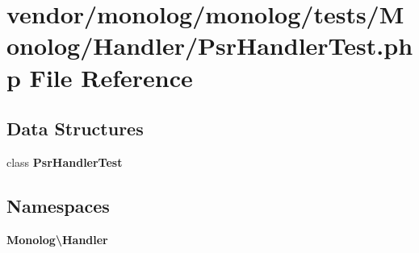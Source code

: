 \section{vendor/monolog/monolog/tests/\+Monolog/\+Handler/\+Psr\+Handler\+Test.php File Reference}
\label{_psr_handler_test_8php}
\subsection*{Data Structures}
\begin{DoxyCompactItemize}
\item 
class {\bf Psr\+Handler\+Test}
\end{DoxyCompactItemize}
\subsection*{Namespaces}
\begin{DoxyCompactItemize}
\item 
 {\bf Monolog\textbackslash{}\+Handler}
\end{DoxyCompactItemize}
